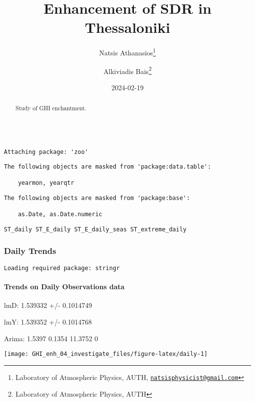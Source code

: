 \documentclass[
  10pt,
  a4paper,oneside]{article}
\title{Enhancement of SDR in Thessaloniki}
\author{Natsis Athanasios\footnote{Laboratory of Atmospheric Physics, AUTH, \href{mailto:natsisphysicist@gmail.com}{\nolinkurl{natsisphysicist@gmail.com}}} \and Alkiviadis Bais\footnote{Laboratory of Atmospheric Physics, AUTH}}
\date{2024-02-19}
\begin{document}
\maketitle
\begin{abstract}
Study of GHI enchantment.
\end{abstract}

{
\hypersetup{linkcolor=}
\setcounter{tocdepth}{4}
\tableofcontents
}
\begin{verbatim}

Attaching package: 'zoo'
\end{verbatim}

\begin{verbatim}
The following objects are masked from 'package:data.table':

    yearmon, yearqtr
\end{verbatim}

\begin{verbatim}
The following objects are masked from 'package:base':

    as.Date, as.Date.numeric
\end{verbatim}

\begin{verbatim}
ST_daily ST_E_daily ST_E_daily_seas ST_extreme_daily
\end{verbatim}

\newpage
\FloatBarrier

\hypertarget{daily-trends}{%
\subsubsection{Daily Trends}\label{daily-trends}}

\newpage

\begin{verbatim}
Loading required package: stringr
\end{verbatim}

\hypertarget{trends-on-daily-observations-data}{%
\paragraph{Trends on Daily Observations data}\label{trends-on-daily-observations-data}}

lmD: 1.539332 +/- 0.1014749

lmY: 1.539352 +/- 0.1014768

Arima: 1.5397 0.1354 11.3752 0

\begin{center}\texttt{[image: GHI\_enh\_04\_investigate\_files/figure-latex/daily-1]} \end{center}
\end{document}
